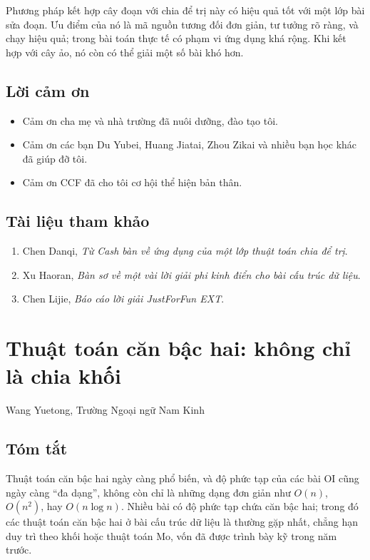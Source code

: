 \documentclass[11pt]{article}
\begin{document}
Phương pháp kết hợp cây đoạn với chia để trị này có hiệu quả tốt với một lớp
bài sửa đoạn. Ưu điểm của nó là mã nguồn tương đối đơn giản, tư tưởng rõ ràng,
và chạy hiệu quả; trong bài toán thực tế có phạm vi ứng dụng khá rộng. Khi kết
hợp với cây ảo, nó còn có thể giải một số bài khó hơn.

\subsection*{Lời cảm ơn}

\begin{itemize}
  \item Cảm ơn cha mẹ và nhà trường đã nuôi dưỡng, đào tạo tôi.
  \item Cảm ơn các bạn Du Yubei, Huang Jiatai, Zhou Zikai và nhiều bạn học
  khác đã giúp đỡ tôi.
  \item Cảm ơn CCF đã cho tôi cơ hội thể hiện bản thân.
\end{itemize}

\subsection*{Tài liệu tham khảo}

\begin{enumerate}
  \item Chen Danqi, \emph{Từ Cash bàn về ứng dụng của một lớp thuật toán chia
  để trị}.
  \item Xu Haoran, \emph{Bàn sơ về một vài lời giải phi kinh điển cho bài cấu
  trúc dữ liệu}.
  \item Chen Lijie, \emph{Báo cáo lời giải JustForFun EXT}.
\end{enumerate}

\section{Thuật toán căn bậc hai: không chỉ là chia khối}

\begin{center}
Wang Yuetong, Trường Ngoại ngữ Nam Kinh
\end{center}

\subsection*{Tóm tắt}

Thuật toán căn bậc hai ngày càng phổ biến, và độ phức tạp của các bài OI cũng
ngày càng ``đa dạng'', không còn chỉ là những dạng đơn giản như
\(O(n)\), \(O(n^2)\), hay \(O(n\log n)\). Nhiều bài có độ phức tạp chứa căn bậc
hai; trong đó các thuật toán căn bậc hai ở bài cấu trúc dữ liệu là thường gặp
nhất, chẳng hạn duy trì theo khối hoặc thuật toán Mo, vốn đã được trình bày kỹ
trong năm trước.
\end{document}
